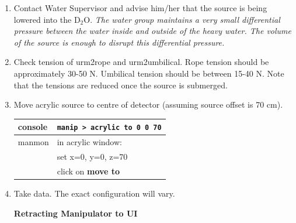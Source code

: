 \begin{enumerate}
\begin{center}
\begin{tabular}{|l|l|}
    \end{tabular}
  \end{center}
\item \CheckBox[name=encp39]{} Contact Water Supervisor and advise him/her that the source is
  being lowered into the D$_{2}$O. {\it The water group maintains a
    very small differential pressure between the water inside and
    outside of the heavy water. The volume of the source is enough to
    disrupt this differential pressure.}
\item \CheckBox[name=encp40]{} Check tension of urm2rope and urm2umbilical. Rope tension should
  be approximately 30-50 N. Umbilical tension should be between 15-40
  N. Note that the tensions are reduced once the source is submerged.
\item \CheckBox[name=encp41]{} Move acrylic source to centre of detector (assuming source
  offset is 70 cm).
  \begin{center}
    \begin{tabular}{|l|l|}
      \hline
      console & \verb+manip > acrylic to 0 0 70+ \\
      \hline
      manmon & in acrylic window: \\
      & set x=0, y=0, z=70\\
      & click on {\bf move to} \\
      \hline
    \end{tabular}
  \end{center}      
\item \CheckBox[name=encp42]{} Take data. The exact configuration will vary.

  \begin{center} {\bf Retracting Manipulator to UI} \end{center}


\end{enumerate}
